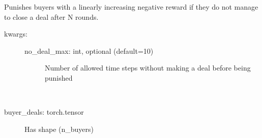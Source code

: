 \documentclass[letterpaper,10pt,english]{sphinxmanual}
\begin{document}
\label{\detokenize{MultiAgentMarketRL:module-reward_setting}}

\begin{fulllineitems}
\label{\detokenize{MultiAgentMarketRL:reward_setting.NoDealPenaltyReward}}
\sphinxAtStartPar
Punishes buyers with a linearly increasing negative reward if they do not manage to close a deal after N rounds.
\begin{description}
\item[{kwargs:}] \leavevmode\begin{description}
\item[{no\_deal\_max: int, optional (default=10)}] \leavevmode
\sphinxAtStartPar
Number of allowed time steps without making a deal before being punished

\end{description}

\end{description}

\begin{fulllineitems}
\label{\detokenize{MultiAgentMarketRL:reward_setting.NoDealPenaltyReward.__init__}}
\end{fulllineitems}


\begin{fulllineitems}
\label{\detokenize{MultiAgentMarketRL:reward_setting.NoDealPenaltyReward.buyer_reward}}~\begin{description}
\item[{buyer\_deals: torch.tensor}] \leavevmode
\sphinxAtStartPar
Has shape (n\_buyers)


\end{description}
\end{fulllineitems}
\end{fulllineitems}
\end{document}
